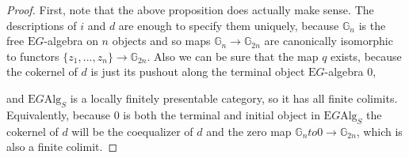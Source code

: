\begin{proof}
First, note that the above proposition does actually make sense. The descriptions of $i$ and $d$ are enough to specify them uniquely, because $\mathbb{G}_n$ is the free $\mathrm{E}G$-algebra on $n$ objects and so maps $\mathbb{G}_n \to \mathbb{G}_{2n}$ are canonically isomorphic to functors $\{z_1, ..., z_n\} \to \mathbb{G}_{2n}$. Also we can be sure that the map $q$ exists, because the cokernel of $d$ is just its pushout along the terminal object $\mathrm{E}G$-algebra $0$,
\begin{eq*}  \end{eq*}
and $\mathrm{E}G\mathrm{Alg}_S$ is a locally finitely presentable category, so it has all finite colimits. Equivalently, because $0$ is both the terminal and initial object in $\mathrm{E}G\mathrm{Alg}_S$ the cokernel of $d$ will be the coequalizer of $d$ and the zero map $\mathbb{G}_n to 0 \to \mathbb{G}_{2n}$, which is also a finite colimit. 


\end{proof}
